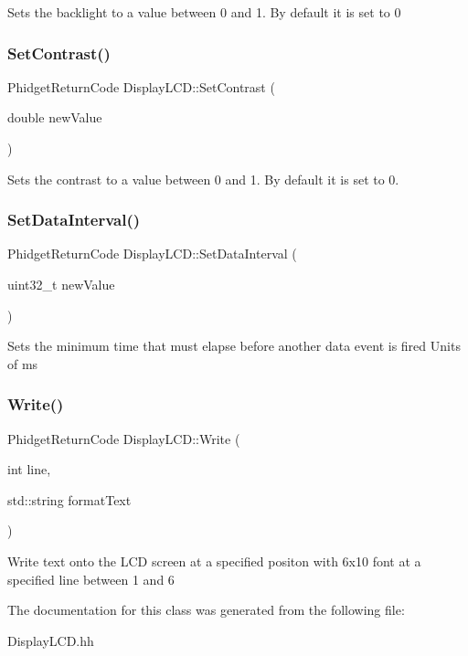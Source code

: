 Sets the backlight to a value between 0 and 1. By default it is set to 0\mbox{\label{classDisplayLCD_a4e97d5bbd320dd69724809d3f446b578}} 
\subsubsection{\texorpdfstring{Set\+Contrast()}{SetContrast()}}
{\footnotesize\ttfamily Phidget\+Return\+Code Display\+L\+C\+D\+::\+Set\+Contrast (\begin{DoxyParamCaption}\item[{double}]{new\+Value }\end{DoxyParamCaption})\hspace{0.3cm}{\ttfamily [inline]}}

Sets the contrast to a value between 0 and 1. By default it is set to 0.\mbox{\label{classDisplayLCD_a07fef3e48aaccd4c66931ee886945e5d}} 
\subsubsection{\texorpdfstring{Set\+Data\+Interval()}{SetDataInterval()}}
{\footnotesize\ttfamily Phidget\+Return\+Code Display\+L\+C\+D\+::\+Set\+Data\+Interval (\begin{DoxyParamCaption}\item[{uint32\+\_\+t}]{new\+Value }\end{DoxyParamCaption})\hspace{0.3cm}{\ttfamily [inline]}}

Sets the minimum time that must elapse before another data event is fired Units of ms\mbox{\label{classDisplayLCD_ab8c5e288a7ce5c0dde1806f821036bac}} 
\subsubsection{\texorpdfstring{Write()}{Write()}}
{\footnotesize\ttfamily Phidget\+Return\+Code Display\+L\+C\+D\+::\+Write (\begin{DoxyParamCaption}\item[{int}]{line,  }\item[{std\+::string}]{format\+Text }\end{DoxyParamCaption})\hspace{0.3cm}{\ttfamily [inline]}}

Write text onto the L\+CD screen at a specified positon with 6x10 font at a specified line between 1 and 6

The documentation for this class was generated from the following file\+:\begin{DoxyCompactItemize}
\item 
Display\+L\+C\+D.\+hh\end{DoxyCompactItemize}
